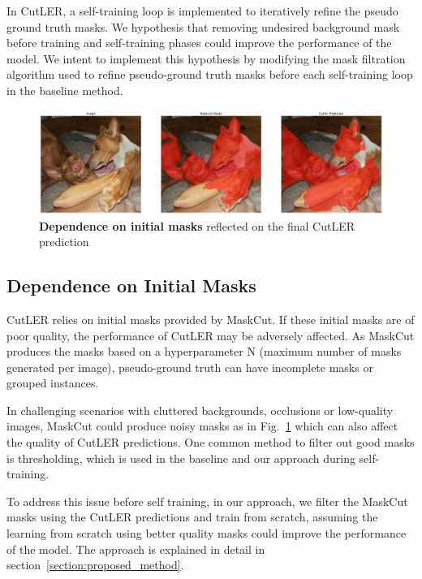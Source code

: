 In CutLER, a self-training loop is implemented to iteratively refine the pseudo ground truth masks. We hypothesis that removing undesired background mask before training and self-training phases could improve the performance of the model. We intent to implement this hypothesis by modifying the mask filtration algorithm used to refine pseudo-ground truth masks before each self-training loop in the baseline method.
\begin{figure}
	\centering
	\includegraphics[width=1\textwidth]{Images/main/cutler_problem_3.png}
	\caption[\textbf{Dependence on Initial Masks}]{\textbf{Dependence on initial masks} reflected on the final CutLER prediction}
	\label{fig:intial_mask_dependence}
\end{figure}
\subsection{Dependence on Initial Masks}

CutLER relies on initial masks provided by MaskCut. If these initial masks are of poor quality, the performance of CutLER may be adversely affected. As MaskCut produces the masks based on a hyperparameter N (maximum number of masks generated per image), pseudo-ground truth can have incomplete masks or grouped instances.

In challenging scenarios with cluttered backgrounds, occlusions or low-quality images, MaskCut could produce noisy masks as in Fig.~\ref{fig:intial_mask_dependence} which can also affect the quality of CutLER predictions. One common method to filter out good masks is thresholding, which is used in the baseline and our approach during self-training.

To address this issue before self training, in our approach, we filter the MaskCut masks using the CutLER predictions and train from scratch, assuming the learning from scratch using better quality masks could improve the performance of the model. The approach is explained in detail in section~\ref{section:proposed_method}.

